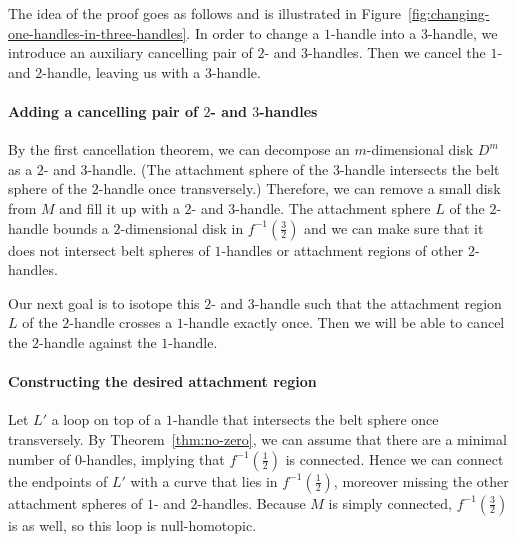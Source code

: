 \begin{myproof}
    The idea of the proof goes as follows and is illustrated in Figure~\ref{fig:changing-one-handles-in-three-handles}.
    In order to change a $1$-handle into a $3$-handle, we introduce an auxiliary cancelling pair of $2$- and $3$-handles.
    Then we cancel the $1$- and $2$-handle, leaving us with a $3$-handle.
    \paragraph{Adding a cancelling pair of $2$- and $3$-handles}
    By the first cancellation theorem, we can decompose an $m$-dimensional disk $D^{m}$ as a $2$- and  $3$-handle. (The attachment sphere of the $3$-handle intersects the belt sphere of the $2$-handle once transversely.)
    Therefore, we can remove a small disk from $M$ and fill it up with a $2$- and $3$-handle.
    The attachment sphere $L$ of the $2$-handle bounds a $2$-dimensional disk in $f^{-1}(\frac{3}{2})$ and we can make sure that it does not intersect belt spheres of $1$-handles or attachment regions of other $2$-handles.

    Our next goal is to isotope this $2$- and $3$-handle such that the attachment region $L$ of the $2$-handle crosses a $1$-handle exactly once. Then we will be able to cancel the $2$-handle against the $1$-handle.

    \paragraph{Constructing the desired attachment region}
    Let $L'$ a loop on top of a $1$-handle that intersects the belt sphere once transversely.
    By Theorem~\ref{thm:no-zero}, we can assume that there are a minimal number of $0$-handles, implying that $f^{-1}(\frac{1}{2})$ is connected.
    Hence we can connect the endpoints of $L'$ with a curve that lies in $f^{-1}(\frac{1}{2})$,
    moreover missing the other attachment spheres of $1$- and $2$-handles.
    Because $M$ is simply connected, $f^{-1}(\frac{3}{2})$ is as well, so this loop is null-homotopic.

\end{myproof}
